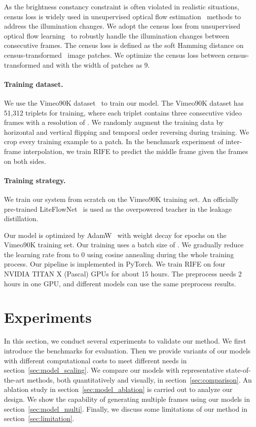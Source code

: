 \documentclass[10pt,twocolumn,letterpaper]{article}
\begin{document}
As the brightness constancy constraint is often violated in realistic situations, census loss is widely used in unsupervised optical flow estimation~\cite{jonschkowski2020matters} methods to address the illumination changes. We adopt the census loss from unsupervised optical flow learning~\cite{meister2017unflow, jonschkowski2020matters} to robustly handle the illumination changes between consecutive frames.
The census loss is defined as the soft Hamming distance on census-transformed~\cite{zabih1994non} image patches. We optimize the census loss  between census-transformed  and  with the width of patches as 9.

\paragraph{Training dataset.}
We use the Vimeo90K dataset~\cite{xue2019video} to train our model.
The Vimeo90K dataset has 51,312 triplets for training, where each triplet contains three consecutive video frames with a resolution of .
We randomly augment the training data by horizontal and vertical flipping and temporal order reversing during training. We crop every training example to a  patch. In the benchmark experiment of inter-frame interpolation, we train RIFE to predict the middle frame given the frames on both sides. 

\paragraph{Training strategy.}
We train our system from scratch on the Vimeo90K training set. An officially pre-trained LiteFlowNet~\cite{hui2018liteflownet} is used as the overpowered teacher in the leakage distillation.

Our model is optimized by AdamW~\cite{loshchilov2018fixing} with weight decay  for  epochs on the Vimeo90K training set. Our training uses a batch size of . We gradually reduce the learning rate from  to 0 using cosine annealing during the whole training process. Our pipeline is implemented in PyTorch. We train RIFE on four NVIDIA TITAN X (Pascal) GPUs for about 15 hours. The preprocess needs 2 hours in one GPU, and different models can use the same preprocess results. 

 	\section{Experiments}
In this section, we conduct several experiments to validate our method. We first introduce the benchmarks for evaluation. Then we provide variants of our models with different computational costs to meet different needs in section~\ref{sec:model_scaling}. We compare our models with representative state-of-the-art methods, both quantitatively and visually, in section~\ref{sec:comparison}. An ablation study in section~\ref{sec:model_ablation} is carried out to analyze our design. We show the capability of generating multiple frames using our models in section~\ref{sec:model_multi}. Finally, we discuss some limitations of our method in section~\ref{sec:limitation}.
\end{document}

